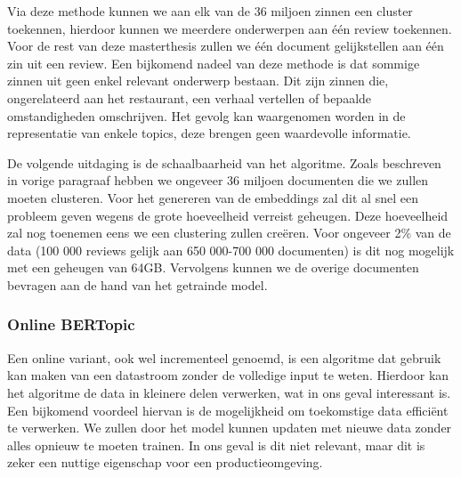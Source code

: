 Via deze methode kunnen we aan elk van de 36 miljoen zinnen een cluster toekennen, hierdoor kunnen we meerdere onderwerpen aan één review toekennen. Voor de rest van deze masterthesis zullen we één document gelijkstellen aan één zin uit een review. Een bijkomend nadeel van deze methode is dat sommige zinnen uit geen enkel relevant onderwerp bestaan. Dit zijn zinnen die, ongerelateerd aan het restaurant, een verhaal vertellen of bepaalde omstandigheden omschrijven. Het gevolg kan waargenomen worden in de representatie van enkele topics, deze brengen geen waardevolle informatie. 

De volgende uitdaging is de schaalbaarheid van het algoritme. Zoals beschreven in vorige paragraaf hebben we ongeveer 36 miljoen documenten die we zullen moeten clusteren. Voor het genereren van de embeddings zal dit al snel een probleem geven wegens de grote hoeveelheid verreist geheugen. Deze hoeveelheid zal nog toenemen eens we een clustering zullen creëren. Voor ongeveer 2\% van de data (100 000 reviews gelijk aan 650 000-700 000 documenten) is dit nog mogelijk met een geheugen van 64GB. Vervolgens kunnen we de overige documenten bevragen aan de hand van het getrainde model.









\subsubsection{Online BERTopic}
Een online variant, ook wel incrementeel genoemd, is een algoritme dat gebruik kan maken van een datastroom zonder de volledige input te weten. Hierdoor kan het algoritme de data in kleinere delen verwerken, wat in ons geval interessant is. Een bijkomend voordeel hiervan is de mogelijkheid om toekomstige data efficiënt te verwerken. We zullen door het model kunnen updaten met nieuwe data zonder alles opnieuw te moeten trainen. In ons geval is dit niet relevant, maar dit is zeker een nuttige eigenschap voor een productieomgeving.

